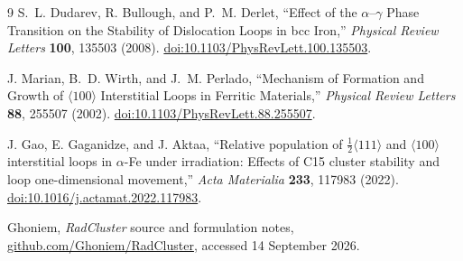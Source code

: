 \documentclass[11pt,a4paper]{article}
\newcommand{\hkl}[1]{\langle #1\rangle}
\newcommand{\half}{\tfrac12}
\begin{document}
\begin{thebibliography}{9}
S.~L. Dudarev, R. Bullough, and P.~M. Derlet,
``Effect of the $\alpha$--$\gamma$ Phase Transition on the Stability of Dislocation Loops in bcc Iron,''
\emph{Physical Review Letters} \textbf{100}, 135503 (2008).
\href{https://doi.org/10.1103/PhysRevLett.100.135503}{doi:10.1103/PhysRevLett.100.135503}.

J. Marian, B.~D. Wirth, and J.~M. Perlado,
``Mechanism of Formation and Growth of $\hkl{100}$ Interstitial Loops in Ferritic Materials,''
\emph{Physical Review Letters} \textbf{88}, 255507 (2002).
\href{https://doi.org/10.1103/PhysRevLett.88.255507}{doi:10.1103/PhysRevLett.88.255507}.

J. Gao, E. Gaganidze, and J. Aktaa,
``Relative population of $\half\hkl{111}$ and $\hkl{100}$ interstitial loops in $\alpha$-Fe under irradiation: Effects of C15 cluster stability and loop one-dimensional movement,''
\emph{Acta Materialia} \textbf{233}, 117983 (2022).
\href{https://doi.org/10.1016/j.actamat.2022.117983}{doi:10.1016/j.actamat.2022.117983}.

Ghoniem, \emph{RadCluster} source and formulation notes,
\href{https://github.com/Ghoniem/RadCluster}{github.com/Ghoniem/RadCluster}, accessed 14 September 2026.
\end{thebibliography}
\end{document}
